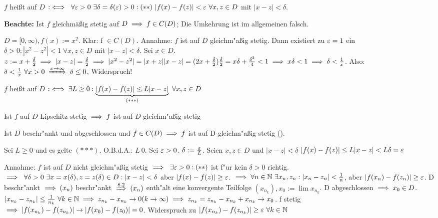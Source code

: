 \documentclass[a4paper,twoside,DIV15,BCOR12mm]{scrbook}
\begin{document}
\begin{definition}
$f$ heißt auf $D$  $:\iff\ \forall \varepsilon>0\ \exists \delta=\delta(\varepsilon)>0: (**)\ |f(x)-f(z)| < \varepsilon\ \forall x,z \in D$ mit $|x-z|<\delta.$
\end{definition}

\textbf{Beachte:} Ist $f$ gleichmäßig stetig auf $D \implies f \in C(D)$; Die Umkehrung ist im allgemeinen falsch.

\begin{beispiel}
$D=[0, \infty), f(x):=x^2$. Klar: f $\in C(D)$. Annahme: $f$ ist auf $D$ gleichm"aßig stetig. Dann existiert zu $\varepsilon=1$ ein $\delta>0: |x^2-z^2|<1\ \forall x,z \in D$ mit $|x-z|<\delta$. Sei $x \in D$. $z:=x+\frac{\delta}{2} \implies |x-z|=\frac{\delta}{2} \implies |x^2-z^2|=|x+z||x-z|=(2x + \frac{\delta}{2})\frac{\delta}{2}=x\delta + \frac{\delta^2}{4}<1 \implies x\delta<1 \implies \delta<\frac{1}{x}$. Also: $\delta<\frac{1}{x}\ \forall x>0 \folgtwegen{x\to\infty} \delta \le 0$, Widerspruch!
\end{beispiel}

\begin{definition}
$f$ heißt auf $D$  $:\iff \exists L\ge 0: \underbrace{|f(x)-f(z)|\le L|x-z|}_{(***)}\ \forall x,z \in D$
\end{definition}

\begin{satz}[Stetigkeitsstätze]
\begin{liste}
\item Ist $f$ auf $D$ Lipschitz stetig $\implies f$ ist auf $D$ gleichm"aßig stetig
\item Ist $D$ beschr"ankt und abgeschlossen und $f\in C(D) \implies f$ ist auf D gleichm"aßig stetig ().
\end{liste}
\end{satz}

\begin{beweise}
\item Sei $L\ge 0$ und es gelte $(***)$. O.B.d.A.: $L\> 0$. Sei $\varepsilon>0$. $\delta:=\frac{\varepsilon}{L}$. Seien $x, z \in D$ und $|x-z|<\delta$ \folgt $|f(x)-f(z)| \le L|x-z|<L\delta=\varepsilon$
\item Annahme: $f$ ist auf $D$ nicht gleichm"aßig stetig $\implies \ \exists \varepsilon>0: (**)$ ist f"ur kein $\delta>0$ richtig. $\implies \ \forall\delta>0\ \exists x=x(\delta),z=z(\delta) \in D: |x-z|<\delta$ aber $|f(x)-f(z)|\ge \varepsilon$. $\implies \forall n \in \mathbb{N}\ \exists x_n, z_n: |x_n-z_n|<\frac{1}{n}$, aber $|f(x_n)-f(z_n)| \ge \varepsilon$. D beschr"ankt $\implies (x_n)$ beschr"ankt $\folgtnach{8.2} (x_n) $ enth"alt eine konvergente Teilfolge $(x_{n_k}), x_0:=\lim x_{n_k}$. D abgeschlossen $\implies x_0 \in D$. $|x_{n_k}-z_{n_k}| \le \frac{1}{n_k}\ \forall k \in \mathbb{N} \implies z_{n_k} - x_{n_k} \to 0 (k \to \infty) \implies z_{n_k} = z_{n_k} - x_{n_k} + x_{n_k} \to x_0$. f stetig $\implies |f(x_{n_k})-f(z_{n_k})| \to |f(x_0)-f(z_0)|=0$. Widerspruch zu $|f(x_{n_k})-f(z_{n_k})|\ge \varepsilon \ \forall k \in \mathbb{N}$
\end{beweise}
\end{document}
